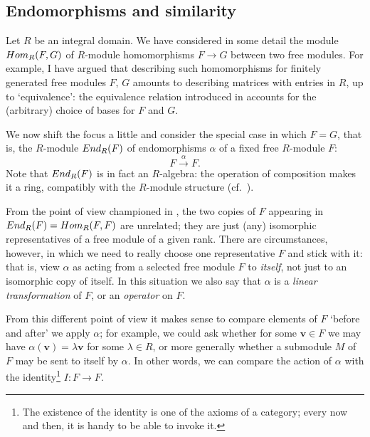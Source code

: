 \subsection{Endomorphisms and similarity}
\label{subsec:linalg:endomorphisms-and-similarity}
Let $R$ be an integral domain. We have considered in some detail the
module $Hom_R(F,G)$ of $R$-module homomorphisms $F \to G$ between two
free modules. For example, I have argued that describing such
homomorphisms for finitely generated free modules $F$, $G$ amounts to
describing matrices with entries in $R$, up to `equivalence': the
equivalence relation introduced in
 accounts for the (arbitrary)
choice of bases for $F$ and $G$.

We now shift the focus a little and consider the special case in which
$F = G$, that is, the $R$-module $End_R(F)$ of endomorphisms $\alpha$
of a fixed free $R$-module $F$:
\[
  F \xrightarrow{\alpha} F.
\]
Note that $End_R(F)$ is in fact an $R$-algebra: the operation of
composition makes it a ring, compatibly with the $R$-module structure
(cf.\ ).

From the point of view championed in
, the two copies
of $F$ appearing in $End_R(F) = Hom_R(F,F)$ are unrelated; they are
just (any) isomorphic representatives of a free module of a given
rank. There are circumstances, however, in which we need to really
choose one representative $F$ and stick with it: that is, view
$\alpha$ as acting from a selected free module $F$ to \emph{itself},
not just to an isomorphic copy of itself. In this situation we also
say that $\alpha$ is a \emph{linear transformation} of $F$, or an
\emph{operator} on $F$.

From this different point of view it makes sense to compare elements
of $F$ `before and after' we apply $\alpha$; for example, we could ask
whether for some $\mathbf{v} \in F$ we may have
$\alpha(\mathbf{v}) = \lambda\mathbf{v}$ for some $\lambda \in R$, or
more generally whether a submodule $M$ of $F$ may be sent to itself by
$\alpha$. In other words, we can compare the action of $\alpha$ with
the identity\footnote{The existence of the identity is one of the
  axioms of a category; every now and then, it is handy to be able to
  invoke it.} $I : F \to F$.

